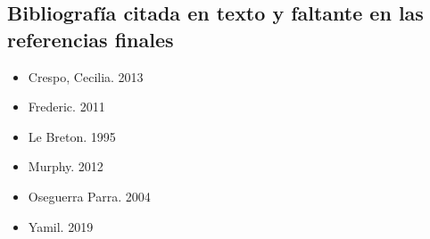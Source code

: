 \subsection*{Bibliografía citada en texto y faltante en las referencias finales}

\begin{itemize}
\tightlist
\item
  Crespo, Cecilia. 2013
\item
  Frederic. 2011
\item
  Le Breton. 1995
\item
  Murphy. 2012
\item
  Oseguerra Parra. 2004
\item
  Yamil. 2019
\end{itemize}
